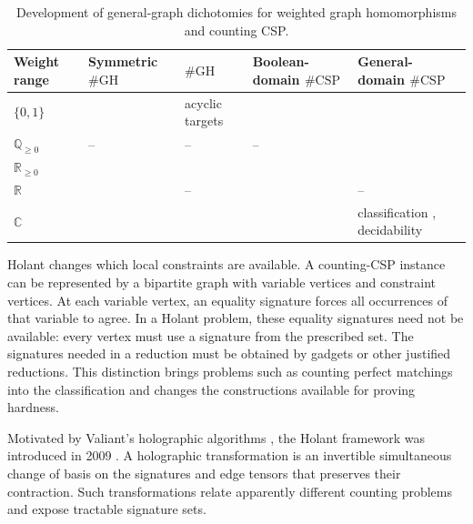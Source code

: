 \documentclass[11pt,letterpaper,onecolumn]{article}
\theoremstyle{plain}
\theoremstyle{definition}
\theoremstyle{remark}
\begin{document}
	\begin{table}[!htbp]
		\centering
		\caption{Development of general-graph dichotomies for weighted graph
			homomorphisms and counting CSP.}
		\label{short:tab:intro-gh-csp-history}
		\normalsize
		\setlength{\tabcolsep}{3.5pt}
		\renewcommand{\arraystretch}{1.16}
		\begin{tabularx}{\textwidth}{@{}l
				>{\raggedright\arraybackslash}X
				>{\raggedright\arraybackslash}X
				>{\raggedright\arraybackslash}X
				>{\raggedright\arraybackslash}X@{}}
			\toprule
			Weight range & Symmetric \(\#\mathrm{GH}\) & \(\#\mathrm{GH}\) &
			Boolean-domain \(\#\mathrm{CSP}\) &
			General-domain \(\#\mathrm{CSP}\) \\
			\midrule
			\(\{0,1\}\)
			& \cite{DyerGreenhill2000}
			& acyclic targets \cite{DyerGoldbergPaterson2007}
			& \cite{CreignouHermann1996}
			& \cite{Bulatov2013,DyerRicherby2013} \\
			\(\mathbb Q_{\ge0}\)
			& -- & -- & --
			& \cite{BulatovDyerGoldbergJalseniusJerrumRicherby2012} \\
			\(\mathbb R_{\ge0}\)
			& \cite{BulatovGrohe2005}
			& \cite{CaiChen2019}
			& \cite{DyerGoldbergJerrum2009}
			& \cite{CaiChenLu2016} \\
			\(\mathbb R\)
			& \cite{GoldbergGroheJerrumThurley2010}
			& --
			& \cite{BulatovDyerGoldbergJalseniusRicherby2009}
			& -- \\
			\(\mathbb C\)
			& \cite{CaiChenLu2013}
			& \cite{CaiChen2017}
			& \cite{CaiLuXia2014}
			& classification \cite{CaiChen2017},
			decidability \cite{LiuMeng2026CSPDecidability} \\
			\bottomrule
		\end{tabularx}
	\end{table}

Holant changes which local constraints are available.  A counting-CSP
instance can be represented by a bipartite graph with variable vertices
and constraint vertices.  At each variable vertex, an equality signature
forces all occurrences of that variable to agree.  In a Holant problem,
these equality signatures need not be available: every vertex must use a
signature from the prescribed set. The signatures needed in a reduction
must be obtained by gadgets or other justified reductions. This distinction brings
problems such as counting perfect matchings into the classification and
changes the constructions available for proving hardness.

Motivated by Valiant's holographic algorithms \cite{Valiant2008}, the
Holant framework was introduced in 2009 \cite{CaiLuXia2009}.
A holographic transformation is an invertible simultaneous change of basis
on the signatures and edge tensors that preserves their contraction.
Such transformations relate apparently different counting problems and
expose tractable signature sets.
\end{document}
